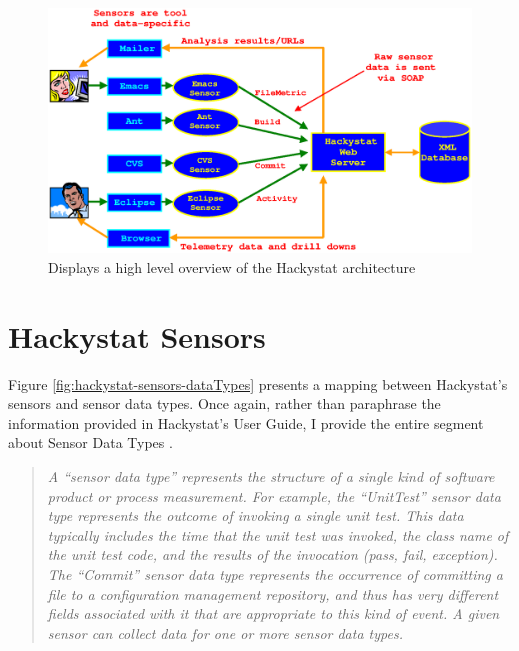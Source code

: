 \begin{figure}[h]
  \centering
  \includegraphics[width=1.00\textwidth]{figs/Architecture.eps}
  \caption[Hackystat Architecture]{Displays a high level overview of the
    Hackystat architecture}
  \label{fig:hackystat-architecture}
\end{figure}

\section{Hackystat Sensors}
Figure \ref{fig:hackystat-sensors-dataTypes} presents a mapping between
Hackystat's sensors and sensor data types. Once again, rather than
paraphrase the information provided in Hackystat's User Guide, I provide
the entire segment about Sensor Data Types \cite{Johnson05}.

\begin{quotation}
  \textit{ A ``sensor data type'' represents the structure of a single kind
    of software product or process measurement. For example, the
    ``UnitTest'' sensor data type represents the outcome of invoking a
    single unit test. This data typically includes the time that the unit
    test was invoked, the class name of the unit test code, and the results
    of the invocation (pass, fail, exception). The ``Commit'' sensor data
    type represents the occurrence of committing a file to a configuration
    management repository, and thus has very different fields associated
    with it that are appropriate to this kind of event. A given sensor can
    collect data for one or more sensor data types.}
\end{quotation}


